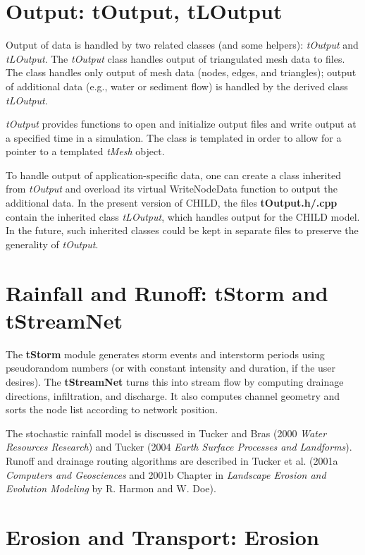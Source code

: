 \documentclass[12pt]{article}
\begin{document}
\section{Output: tOutput, tLOutput}

Output of data is handled by two related classes (and some helpers): 
{\em tOutput} and {\em tLOutput}. 
  The {\em tOutput} class handles output of triangulated mesh data to
   files. The class handles only output of mesh data (nodes,
   edges, and triangles); output of additional data (e.g., water or
   sediment flow) is handled by the derived class {\em tLOutput}.
 
   {\em tOutput} provides functions to open and initialize output files and
   write output at a specified time in a simulation. The class is
   templated in order to allow for a pointer to a templated
   {\em tMesh} object.
 
 To handle output of application-specific data, one can create a
 class inherited from {\em tOutput} and overload its virtual
 WriteNodeData function to output the additional data.
In the present version of CHILD, the files {\bf tOutput.h/.cpp}
contain the inherited class {\em tLOutput}, which handles output for
the CHILD model. In the future, such inherited classes could be
kept in separate files to preserve the generality of {\em tOutput}.

\section{Rainfall and Runoff: tStorm and tStreamNet}

The {\bf tStorm} module generates storm events and interstorm periods
using pseudorandom numbers (or with constant intensity and duration,
if the user desires). The {\bf tStreamNet} turns this into stream flow
by computing drainage directions, infiltration, and discharge. It also
computes channel geometry and sorts the node list according to network
position. 

The stochastic rainfall model is discussed in Tucker and Bras (2000
{\em Water Resources Research}) and Tucker (2004 {\em Earth
Surface Processes and Landforms}). Runoff and drainage routing algorithms are
described in Tucker et al. (2001a {\em Computers and Geosciences} and
2001b Chapter in {\em Landscape Erosion and Evolution Modeling} by
R. Harmon and W. Doe).


\section{Erosion and Transport: Erosion}
\end{document}
